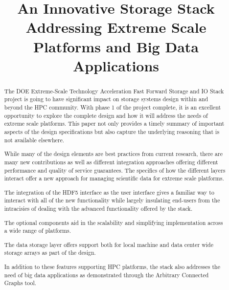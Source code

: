 \documentclass[conference]{IEEEtran}
\begin{document}

\title{An Innovative Storage Stack Addressing Extreme Scale Platforms and Big Data Applications}

\author{
}
\maketitle

\begin{abstract}
The DOE Extreme-Scale Technology Acceleration Fast Forward Storage and IO Stack
project is going to have significant impact on storage systems design within
and beyond the HPC community. With phase 1 of the project complete, it is an
excellent opportunity to explore the complete design and how it will address
the needs of extreme scale platforms.  This paper not only provides a timely
summary of important aspects of the design specifications but also capture the
underlying reasoning that is not available elsewhere.

While many of the design elements are best practices from current research,
there are many new contributions as well as different integration approaches
offering different performance and quality of service guarantees. The specifics
of how the different layers interact offer a new approach for managing
scientific data for extreme scale platforms.

The integration of the HDF5 interface as the user interface gives a familiar
way to imteract with all of the new functionality while largely insulating 
end-users from the intracisies of dealing with the advanced functionality
offered by the stack.

The optional components aid in the scalability and simplifying implementation
across a wide range of platforms.

The data storage layer offers support both for local machine and data center
wide storage arrays as part of the design.

In addition to these features supporting HPC platforms, the stack also addresses
the need of big data applications as demonstrated through the Arbitrary Connected Graphs tool.

\end{abstract}
\end{document}
